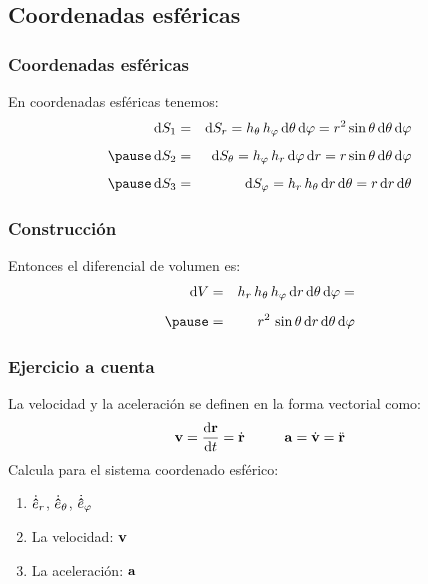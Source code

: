 \documentclass[12pt]{beamer}
\begin{document}
\subsection*{Coordenadas esféricas}

\begin{frame}
\frametitle{Coordenadas esféricas}
En coordenadas esféricas tenemos:
\pause
\begin{eqnarray*}
\dd{S_{1}} &=& \dd{S_{r}} = h_{\theta} \, h_{\varphi} \dd{\theta} \dd{\varphi} = r^{2} \sin \theta \dd{\theta} \dd{\varphi} \\[0.5em] \pause
\dd{S_{2}} &=& \dd{S_{\theta}} = h_{\varphi} \, h_{r} \dd{\varphi} \dd{r} = r \sin \theta \dd{\theta} \dd{\varphi} \\[0.5em] \pause
\dd{S_{3}} &=& \dd{S_{\varphi}} = h_{r} \, h_{\theta} \dd{r} \dd{\theta} = r \dd{r} \dd{\theta}
\end{eqnarray*}
\end{frame}
\begin{frame}
\frametitle{Construcción}
Entonces el diferencial de volumen es:
\pause
\begin{eqnarray*}
\dd{V} &=& h_{r} \, h_{\theta} \, h_{\varphi} \dd{r} \dd{\theta} \dd{\varphi} = \\[0.5em] \pause
&=& r^{2} \, \sin \theta \dd{r} \dd{\theta} \dd{\varphi}
\end{eqnarray*}
\end{frame}
\begin{frame}
\frametitle{Ejercicio a cuenta}
La velocidad y la aceleración se definen en la forma vectorial como:
\begin{align*}
\vb{v} = \dv{\vb{r}}{t} = \dot{\vb{r}} \hspace{1cm} \vb{a} = \dot{\vb{v}} = \ddot{\vb{r}}
\end{align*}
Calcula para el sistema coordenado esférico:
\begin{enumerate}[<+->]
\item $\dot{\vu{e}}_{r}$, $\dot{\vu{e}}_{\theta}$, $\dot{\vu{e}}_{\varphi}$ 
\item La velocidad: $\vb{v}$
\item La aceleración: $\vb{a}$
\end{enumerate}
\end{frame}
\end{document}
